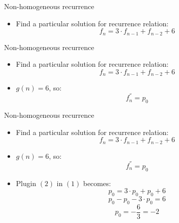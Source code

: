 \documentclass{beamer}
\begin{document}
\begin{frame}{Non-homogeneous recurrence}
    \begin{itemize}
        \item Find a particular solution for recurrence relation:
            \begin{equation}\tag{1}
                f_n = 3 \cdot f_{n-1} + f_{n-2} + 6
            \end{equation}
    \end{itemize}
\end{frame}

\begin{frame}{Non-homogeneous recurrence}
    \begin{itemize}
        \item Find a particular solution for recurrence relation:
            \begin{equation}\tag{1}
                f_n = 3 \cdot f_{n-1} + f_{n-2} + 6
            \end{equation}
        \item $g(n) = 6$, so:
            \begin{equation}\tag{2}
                f_n^{''} = p_0
            \end{equation}
    \end{itemize}
\end{frame}

\begin{frame}{Non-homogeneous recurrence}
    \begin{itemize}
        \item Find a particular solution for recurrence relation:
            \begin{equation}\tag{1}
                f_n = 3 \cdot f_{n-1} + f_{n-2} + 6
            \end{equation}
        \item $g(n) = 6$, so:
            \begin{equation}\tag{2}
                f_n^{''} = p_0
            \end{equation}
        \item Plugin $(2)$ in $(1)$ becomes: 
            $$ p_0 = 3 \cdot p_0 + p_0 + 6 $$
            $$ p_0 - p_0 - 3 \cdot p_0 = 6 $$
            \begin{equation}\tag{3}
                p_0 = - \frac{6}{3} =  -2
            \end{equation}
    \end{itemize}
\end{frame}
\end{document}
